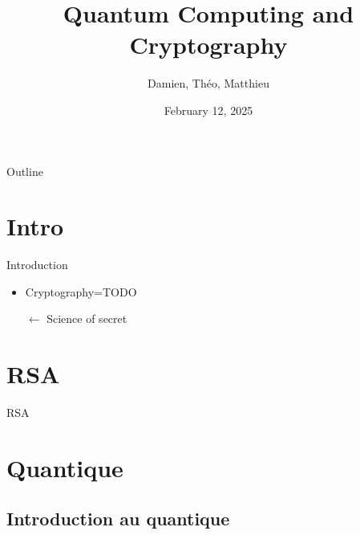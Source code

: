 \documentclass{beamer}
\title{Quantum Computing and Cryptography}
\author{Damien, Théo, Matthieu}
\institute{University}
\date{February 12, 2025}
\begin{document}
\begin{frame}
\maketitle
\end{frame}

\begin{frame}{Outline}
\tableofcontents
\end{frame}

\section{Intro}
\begin{frame}{Introduction}
\begin{linenumbers}
	\begin{itemize}
		\item Cryptography=TODO
		\item[$\leftarrow$] Science of secret
	\end{itemize}
\end{linenumbers}
\end{frame}

\section{RSA}
\begin{frame}{RSA}
\begin{linenumbers}

\end{linenumbers}
\end{frame}

\section{Quantique}

\subsection{Introduction au quantique}
\end{document}
